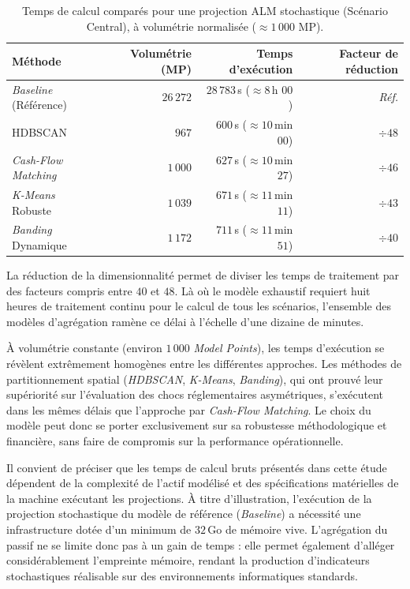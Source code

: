 \begin{table}[H]
    \centering
    \renewcommand{\arraystretch}{1.4}
    \begin{tabular}{|l|r|r|r|}
        \hline
        \textbf{Méthode} & \textbf{Volumétrie (MP)} & \textbf{Temps d'exécution} & \textbf{Facteur de réduction} \\
        \hline
        \textit{Baseline} (Référence) & $26\,272$ & $28\,783$\,s ($\approx 8$\,h $00$) & \textit{Réf.} \\
        \hline
        HDBSCAN & $967$ & $600$\,s ($\approx 10$\,min $00$) & $\div 48$ \\
        \textit{Cash-Flow Matching} & $1\,000$ & $627$\,s ($\approx 10$\,min $27$) & $\div 46$ \\
        \textit{K-Means} Robuste & $1\,039$ & $671$\,s ($\approx 11$\,min $11$) & $\div 43$ \\
        \textit{Banding} Dynamique & $1\,172$ & $711$\,s ($\approx 11$\,min $51$) & $\div 40$ \\
        \hline
    \end{tabular}
    \caption{Temps de calcul comparés pour une projection ALM stochastique (Scénario Central), à volumétrie normalisée ($\approx 1\,000$ MP).}
    \label{tab:runtimes_comparaison}
\end{table}

La réduction de la dimensionnalité permet de diviser les temps de traitement par des facteurs compris entre $40$ et $48$. Là où le modèle exhaustif requiert huit heures de traitement continu pour le calcul de tous les scénarios, l'ensemble des modèles d'agrégation ramène ce délai à l'échelle d'une dizaine de minutes. 

À volumétrie constante (environ $1\,000$ \textit{Model Points}), les temps d'exécution se révèlent extrêmement homogènes entre les différentes approches. Les méthodes de partitionnement spatial (\textit{HDBSCAN}, \textit{K-Means}, \textit{Banding}), qui ont prouvé leur supériorité sur l'évaluation des chocs réglementaires asymétriques, s'exécutent dans les mêmes délais que l'approche par \textit{Cash-Flow Matching}. Le choix du modèle peut donc se porter exclusivement sur sa robustesse méthodologique et financière, sans faire de compromis sur la performance opérationnelle.

Il convient de préciser que les temps de calcul bruts présentés dans cette étude dépendent de la complexité de l'actif modélisé et des spécifications matérielles de la machine exécutant les projections. À titre d'illustration, l'exécution de la projection stochastique du modèle de référence (\textit{Baseline}) a nécessité une infrastructure dotée d'un minimum de $32$\,Go de mémoire vive. L'agrégation du passif ne se limite donc pas à un gain de temps : elle permet également d'alléger considérablement l'empreinte mémoire, rendant la production d'indicateurs stochastiques réalisable sur des environnements informatiques standards.

